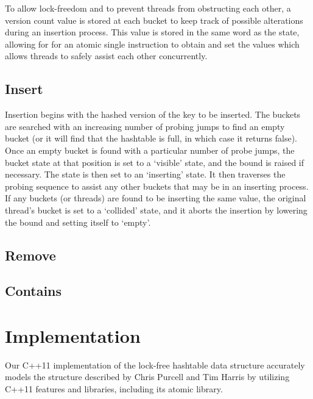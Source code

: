 \documentclass[journal]{IEEEtran}
\begin{document}
	To allow lock-freedom and to prevent threads from obstructing each other, a version count value is stored at each bucket to keep track of possible alterations during an insertion process. This value is stored in the same word as the state, allowing for for an atomic single instruction to obtain and set the values which allows threads to safely assist each other concurrently.

\subsection{Insert}
Insertion begins with the hashed version of the key to be inserted. The buckets are searched with an increasing number of probing jumps to find an empty bucket (or it will find that the hashtable is full, in which case it returns false). Once an empty bucket is found with a particular number of probe jumps, the bucket state at that position is set to a ‘visible’ state, and the bound is raised if necessary. The state is then set to an ‘inserting’ state. It then traverses the probing sequence to assist any other buckets that may be in an inserting process. If any buckets (or threads) are found to be inserting the same value, the original thread's bucket is set to a ‘collided’ state, and it aborts the insertion by lowering the bound and setting itself to ‘empty’.


\subsection{Remove}


\subsection{Contains}



\section{Implementation}

Our C++11 implementation of the lock-free hashtable data structure accurately models the structure described by Chris Purcell and Tim Harris by utilizing C++11 features and libraries, including its atomic library.
\end{document}
